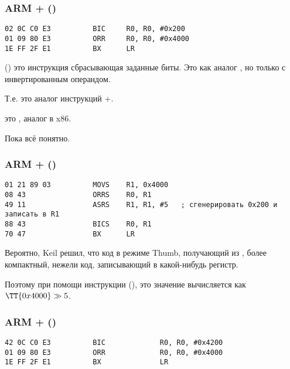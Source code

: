 \subsubsection{ARM + \OptimizingKeilVI (\ARMMode)}

\begin{lstlisting}[caption=\OptimizingKeilVI (\ARMMode),style=customasmARM]
02 0C C0 E3          BIC     R0, R0, #0x200
01 09 80 E3          ORR     R0, R0, #0x4000
1E FF 2F E1          BX      LR
\end{lstlisting}

 () это инструкция сбрасывающая заданные биты. 
Это как аналог \AND, но только с инвертированным операндом.

Т.е. это аналог инструкций \NOT+\AND.

 это , аналог \OR в x86.

Пока всё понятно.

\subsubsection{ARM + \OptimizingKeilVI (\ThumbMode)}

\begin{lstlisting}[caption=\OptimizingKeilVI (\ThumbMode),style=customasmARM]
01 21 89 03          MOVS    R1, 0x4000
08 43                ORRS    R0, R1
49 11                ASRS    R1, R1, #5   ; сгенерировать 0x200 и записать в R1
88 43                BICS    R0, R1
70 47                BX      LR
\end{lstlisting}

Вероятно, Keil решил, что код в режиме Thumb,
получающий  из , 
более компактный, нежели код, 
записывающий  в какой-нибудь регистр.

Поэтому при помощи инструкции  (\ASRdesc), это значение вычисляется как $\TT{0x4000} \gg 5$.

\subsubsection{ARM + \OptimizingXcodeIV (\ARMMode)}
\label{anomaly:LLVM}
\myindex{\CompilerAnomaly}

\begin{lstlisting}[caption=\OptimizingXcodeIV (\ARMMode),label=ARM_leaf_example3,style=customasmARM]
42 0C C0 E3          BIC             R0, R0, #0x4200
01 09 80 E3          ORR             R0, R0, #0x4000
1E FF 2F E1          BX              LR
\end{lstlisting}

